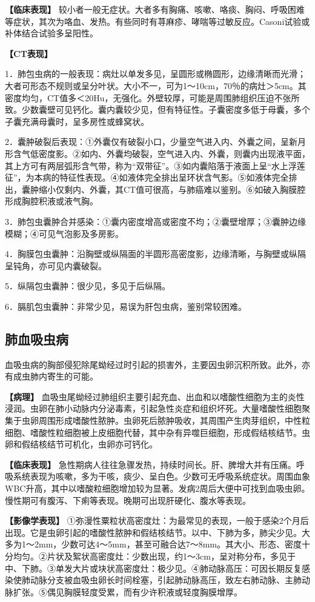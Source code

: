 \textbf{【临床表现】}
较小者一般无症状。大者多有胸痛、咳嗽、咯痰、胸闷、呼吸困难等症状，其次为咯血、发热。有些同时有荨麻疹、哮喘等过敏反应。Casoni试验或补体结合试验多呈阳性。

\textbf{【CT表现】}

1．肺包虫病的一般表现：病灶以单发多见，呈圆形或椭圆形，边缘清晰而光滑；大者可形态不规则或呈分叶状。大小不一，可为1～10cm，70％的病灶＞5cm。其密度均匀，CT值多＜20Hu，无强化。外壁较厚，可能是周围肺组织压迫不张所致。少数囊壁可见钙化。囊内囊较少见，但有特征性。子囊密度多低于母囊，多个子囊充满母囊时，呈多房性或蜂窝状。

2．囊肿破裂后表现：①外囊仅有破裂小口，少量空气进入内、外囊之间，呈新月形含气低密度影。②如内、外囊均破裂，空气进入内、外囊，则囊内出现液平面，其上方可有两层弧形含气带，称为“双带征”。③如内囊陷落于液面上呈“水上浮莲征”，为本病的特征性表现。④如液体完全排出呈环状含气影。⑤如液体完全排出，囊肿缩小仅剩内、外囊，其CT值可很高，与肺癌难以鉴别。⑥如破入胸膜腔形成胸腔积液或液气胸。

3．肺包虫囊肿合并感染：①囊内密度增高或密度不均；②囊壁增厚；③囊肿边缘模糊；④可见气泡影及多房影。

4．胸膜包虫囊肿：沿胸壁或纵隔面的半圆形高密度影，边缘清晰，与胸壁或纵隔呈钝角，亦可见内囊破裂。

5．纵隔包虫囊肿：很少见，多见于后纵隔。

6．膈肌包虫囊肿：非常少见，易误为肝包虫病，鉴别常较困难。

\subsection{肺血吸虫病}

血吸虫病的胸部侵犯除尾蚴经过时引起的损害外，主要因虫卵沉积所致。此外，亦有成虫肺内寄生的可能。

\textbf{【病理】}
血吸虫尾蚴经过肺组织主要引起充血、出血和以嗜酸性细胞为主的炎性浸润。虫卵在肺小动脉内分泌毒素，引起急性炎症和组织坏死。大量嗜酸性细胞聚集于虫卵周围形成嗜酸性脓肿。虫卵死后脓肿吸收，其周围产生肉芽组织，中性粒细胞、嗜酸性粒细胞被上皮细胞代替，其中杂有异噬巨细胞，形成假结核结节。虫卵和假结核结节可机化，虫卵亦可钙化。

\textbf{【临床表现】}
急性期病人往往急骤发热，持续时间长。肝、脾增大并有压痛。呼吸系统表现为咳嗽，多为干咳，痰少、呈白色。少数可无呼吸系统症状。周围血象WBC升高，其中以嗜酸粒细胞增加较为显著。发病2周后大便中可找到血吸虫卵。慢性期可有腹泻、下痢等表现。晚期可出现肝硬化、腹水等表现。

\textbf{【影像学表现】}
①弥漫性粟粒状高密度灶：为最常见的表现，一般于感染2个月后出现。它是虫卵引起的嗜酸性脓肿和假结核结节。以中、下肺为多，肺尖少见。大多为1～2mm，少数可达4～5mm，甚至可融合达7～8mm。其大小、形态、密度十分均匀。②片状及絮状高密度灶：少数出现，约1～3cm，呈对称分布，多见于中、下肺。③单发大片或块状高密度灶：极少见。④肺动脉高压：可因长期反复感染使肺动脉分支被血吸虫卵长时间栓塞，引起肺动脉高压，致左右肺动脉、主肺动脉扩张。⑤偶见胸膜轻度受累，而有少许积液或轻度胸膜增厚。


